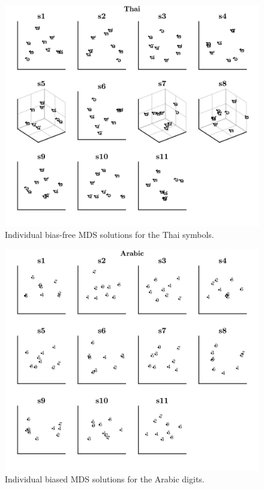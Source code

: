 \begin{figure}[tbh]
\centering \includegraphics[scale = .67]{Figures/Appendix/AppE/BiasFree_Indiv_MDS_4.jpg}
\caption{Individual bias-free MDS solutions for the Thai symbols.}
\label{fig:Apx_MDSthai_Cross}
\end{figure}



\begin{figure}[tbh]
\centering \includegraphics[scale = .67]{Figures/Appendix/AppE/Biased_Indiv_MDS_1.jpg}
\caption{Individual biased MDS solutions for the Arabic digits.}
\label{fig:Apx_MDSenglishBiased_Cross}
\end{figure}

